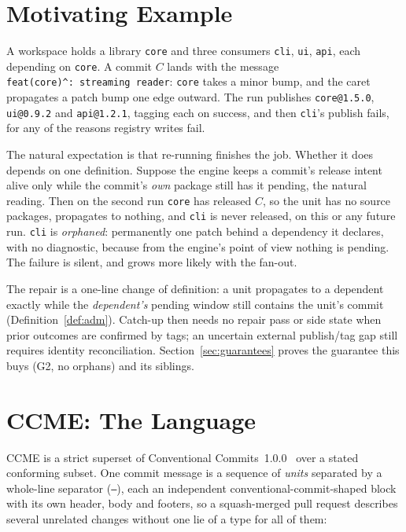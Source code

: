\documentclass[10pt,conference]{IEEEtran}
\theoremstyle{definition}
\newcommand{\code}[1]{\texttt{#1}}
\newcommand{\G}[1]{G#1}
\begin{document}
\section{Motivating Example}
\label{sec:motivation}

A workspace holds a library \code{core} and three consumers \code{cli},
\code{ui}, \code{api}, each depending on \code{core}. A commit $C$ lands
with the message \code{feat(core)\^{}:~streaming reader}: \code{core}
takes a minor bump, and the caret propagates a patch bump one edge
outward. The run publishes \code{core@1.5.0}, \code{ui@0.9.2} and
\code{api@1.2.1}, tagging each on success, and then \code{cli}'s publish
fails, for any of the reasons registry writes fail.

The natural expectation is that re-running finishes the job. Whether it
does depends on one definition. Suppose the engine keeps a commit's
release intent alive only while the commit's \emph{own} package still has
it pending, the natural reading. Then on the second run \code{core}
has released $C$, so the unit has no source packages, propagates to
nothing, and \code{cli} is never released, on this or any future run.
\code{cli} is \emph{orphaned}: permanently one patch behind a dependency
it declares, with no diagnostic, because from the engine's point of view
nothing is pending. The failure is silent, and grows more likely with
the fan-out.

The repair is a one-line change of definition: a unit propagates to a
dependent exactly while the \emph{dependent's} pending window still
contains the unit's commit (Definition~\ref{def:adm}). Catch-up then
needs no repair pass or side state when prior outcomes are confirmed by tags;
an uncertain external publish/tag gap still requires identity reconciliation.
Section~\ref{sec:guarantees} proves the guarantee this buys (\G{2}, no
orphans) and its siblings.

\section{CCME: The Language}
\label{sec:ccme}

CCME is a strict superset of Conventional Commits~1.0.0~\cite{cc} over a
stated conforming subset. One commit message is a sequence of
\emph{units} separated by a whole-line separator (\code{---}), each an
independent conventional-commit-shaped block with its own header, body
and footers, so a squash-merged pull request describes several unrelated
changes without one lie of a type for all of them:
\end{document}

